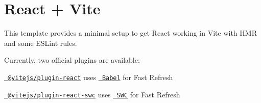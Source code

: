 \chapter{React + Vite}
\hypertarget{md_frontend_2_r_e_a_d_m_e}{}\label{md_frontend_2_r_e_a_d_m_e}
\label{md_frontend_2_r_e_a_d_m_e_autotoc_md12}%
%
 This template provides a minimal setup to get React working in Vite with HMR and some ESLint rules.

Currently, two official plugins are available\+:


\begin{DoxyItemize}
\item \href{https://github.com/vitejs/vite-plugin-react/blob/main/packages/plugin-react/README.md}{\texttt{ @vitejs/plugin-\/react}} uses \href{https://babeljs.io/}{\texttt{ Babel}} for Fast Refresh
\item \href{https://github.com/vitejs/vite-plugin-react-swc}{\texttt{ @vitejs/plugin-\/react-\/swc}} uses \href{https://swc.rs/}{\texttt{ SWC}} for Fast Refresh 
\end{DoxyItemize}